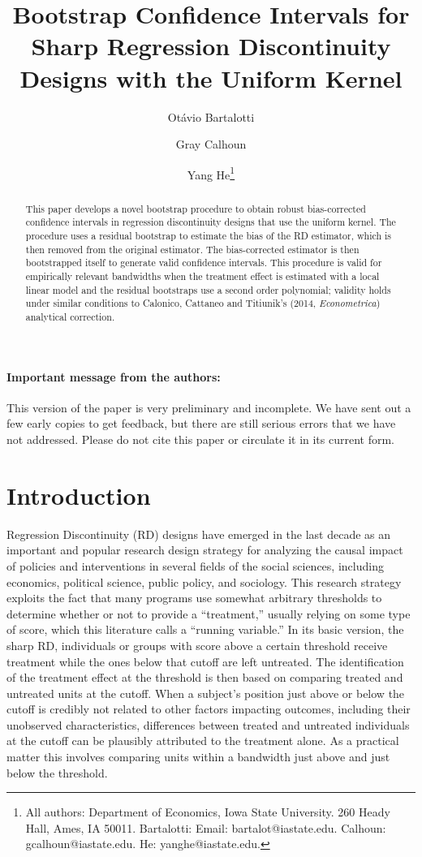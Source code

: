 \documentclass[12pt,fleqn]{article}
\title{Bootstrap Confidence Intervals for Sharp Regression Discontinuity Designs
  with the Uniform Kernel}
\author{Ot\'avio Bartalotti \and Gray Calhoun \and Yang He\thanks{All authors:
Department of Economics, Iowa State University. 260 Heady Hall, Ames, IA  50011.
Bartalotti: Email: bartalot@iastate.edu. Calhoun: gcalhoun@iastate.edu.
He: yanghe@iastate.edu.}}
\begin{document}
\maketitle

\begin{abstract}\noindent
  This paper develops a novel bootstrap procedure to obtain robust
  bias-corrected confidence intervals in regression discontinuity designs that
  use the uniform kernel. The procedure uses a residual bootstrap to estimate
  the bias of the RD estimator, which is then removed from the original
  estimator.  The bias-corrected estimator is then bootstrapped itself to
  generate valid confidence intervals. This procedure is valid for empirically
  relevant bandwidths when the treatment effect is estimated with a local linear
  model and the residual bootstraps use a second order polynomial; validity
  holds under similar conditions to Calonico, Cattaneo and Titiunik's (2014,
  \textit{Econometrica}) analytical correction.
\end{abstract}

\paragraph{Important message from the authors:} This version of the paper is
very preliminary and incomplete. We have sent out a few early copies to get
feedback, but there are still serious errors that we have not addressed. Please
do not cite this paper or circulate it in its current form.

\newpage
\section{Introduction}
Regression Discontinuity (RD) designs have emerged in the last decade as an
important and popular research design strategy for analyzing the causal impact
of policies and interventions in several fields of the social sciences,
including economics, political science, public policy, and sociology.
This research strategy exploits the fact that many programs use somewhat
arbitrary thresholds to determine whether or not to provide a ``treatment,''
usually relying on some type of score, which this literature calls a ``running
variable.'' In its basic version, the sharp RD,  individuals or groups with score above a
certain threshold receive treatment while the ones below that cutoff are left
untreated.
The identification of the treatment effect at the threshold is then based on
comparing treated and untreated units at the cutoff. When a subject's
position just above or below the cutoff is credibly not related to
other factors impacting outcomes, including their unobserved
characteristics, differences between treated and untreated individuals
at the cutoff can be plausibly attributed to the treatment alone. As a
practical matter this involves comparing units within a bandwidth just
above and just below the threshold.
\end{document}
